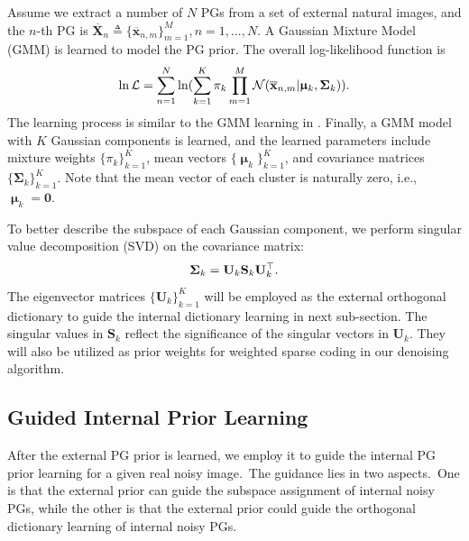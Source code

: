 \documentclass[10pt,twocolumn,letterpaper]{article}
\begin{document}
Assume we extract a number of $N$ PGs from a set of external natural images, and the $n$-th PG is $\mathbf{\overline{X}}_{n}\triangleq \{\mathbf{\overline{x}}_{n,m}\}_{m=1}^{M}, n=1,...,N$. A Gaussian Mixture Model (GMM) is learned to model the PG prior. The overall log-likelihood function is
\vspace{-2mm}
\begin{equation}\label{equ1}\vspace{-2mm}
\begin{split}
\ln\mathcal{L}=\sum_{n=1}^{N} \ln(\sum_{k=1}^{K}\pi_{k}\prod_{m=1}^{M}\mathcal{N}(\mathbf{\overline{x}}_{n,m}|\boldsymbol{\upmu}_{k},\mathbf{\Sigma}_{k})).
\end{split}
\end{equation}
The learning process is similar to the GMM learning in \cite{pgpd,epll}. Finally, a GMM model with $K$ Gaussian components is learned, and the learned parameters include mixture weights $\{\pi_{k}\}_{k=1}^{K}$, mean vectors $\{\boldsymbol{\upmu}_{k}\}_{k=1}^{K}$, and covariance matrices $\{\mathbf{\Sigma}_{k}\}_{k=1}^{K}$. Note that the mean vector of each cluster is naturally zero, i.e., $\boldsymbol{\upmu}_{k}=\mathbf{0}$.  

To better describe the subspace of each Gaussian component, we perform singular value decomposition (SVD) on the covariance matrix:
\vspace{-2mm}
\begin{equation}\label{equ2}\vspace{-2mm}
\mathbf{\Sigma}_{k}=\mathbf{U}_{k}\mathbf{S}_{k}\mathbf{U}_{k}^{\top}.
\end{equation}
The eigenvector matrices $\{\mathbf{U}_{k}\}_{k=1}^{K}$ will be employed as the external orthogonal dictionary to guide the internal dictionary learning in next sub-section. The singular values in $\mathbf{S}_{k}$ reflect the significance of the singular vectors in $\mathbf{U}_{k}$. They  will also be utilized as prior weights for weighted sparse coding in our denoising algorithm.


\subsection{Guided Internal Prior Learning}

After the external PG prior is learned, we employ it to guide the internal PG prior learning for a given real noisy image.\ The guidance lies in two aspects.\ One is that the external prior can guide the subspace assignment of internal noisy PGs, while the other is that the external prior could guide the orthogonal dictionary learning of internal noisy PGs.
\end{document}
